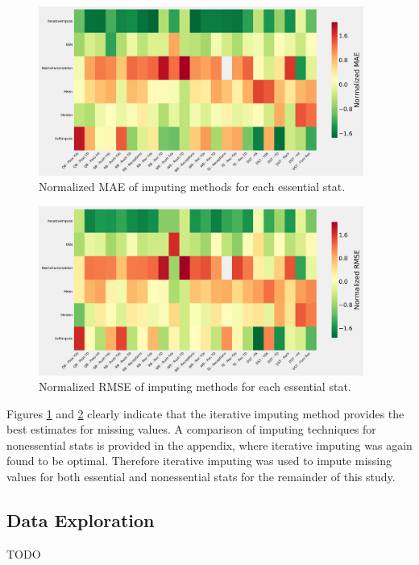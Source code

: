 \documentclass[12pt]{article}
\begin{document}
\begin{figure}[H]
  \centering
  \includegraphics[width=0.95\textwidth]{../figures/impute_MAE}
  \caption{Normalized MAE of imputing methods for each essential stat.}
  \label{impute MAE}
\end{figure}

\begin{figure}[H]
  \centering
  \includegraphics[width=0.95\textwidth]{../figures/impute_RMSE}
  \caption{Normalized RMSE of imputing methods for each essential stat.}
  \label{impute RMSE}
\end{figure}

Figures \ref{impute MAE} and \ref{impute RMSE} clearly indicate that the iterative imputing method provides the best estimates for missing values.  A comparison of imputing techniques for nonessential stats is provided in the appendix, where iterative imputing was again found to be optimal. Therefore iterative imputing was used to impute missing values for both essential and nonessential stats for the remainder of this study.

\subsection{Data Exploration}
TODO
\end{document}
